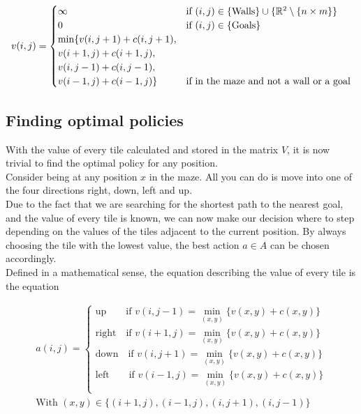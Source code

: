 \documentclass[conference]{IEEEtran}
\begin{document}
\begin{scriptsize}
\begin{equation}
v(i,j) =
  \begin{cases}
  \centering
    \infty & \text{if } (i,j) \in \{\text{Walls}\} \cup \{ \mathbb{R}^2 \setminus \{n \times m\}\}\\
    0 & \text{if } (i,j) \in \{\text{Goals}\}\\
    \min \{v(i,j+1) + c(i,j+1), \\v(i+1,j) + c(i+1,j), \\v(i,j-1) + c(i,j-1), \\v(i-1,j) + c(i-1,j)\} & \text{if in the maze and not a wall or a goal}
  \end{cases}
\end{equation}
\end{scriptsize}

\subsection{Finding optimal policies}
With the value of every tile calculated and stored in the matrix $V$, it is now trivial to find the optimal policy for any position.\\
Consider being at any position $x$ in the maze. All you can do is move into one of the four directions right, down, left and up. \\
Due to the fact that we are searching for the shortest path to the nearest goal, and the value of every tile is known, we can now make our decision where to step depending on the values of the tiles adjacent to the current position. By always choosing the tile with the lowest value, the best action $a \in A$ can be chosen accordingly.\\
Defined in a mathematical sense, the equation describing the value of every tile is the equation 
\begin{small}
\begin{align} 
\label{policy}
a(i,j)=
	\begin{cases}
		\text{up} \quad \quad \text{if } v(i,j-1) = \min_{(x,y)} \{v(x,y) + c(x,y)\} \\
		\text{right} \quad \text{if } v(i+1,j) = \min_{(x,y)} \{v(x,y) + c(x,y)\} \\
		\text{down} \quad \text{if } v(i,j+1) = \min_{(x,y)} \{v(x,y) + c(x,y)\} \\
		\text{left} \quad \quad \text{if } v(i-1,j) = \min_{(x,y)} \{v(x,y) + c(x,y)\} \\
	\end{cases} \\
	\text{With } (x,y) \in \{(i+1,j),(i-1,j),(i,j+1),(i,j-1)\}
\end{align}
\end{small}
\end{document}
